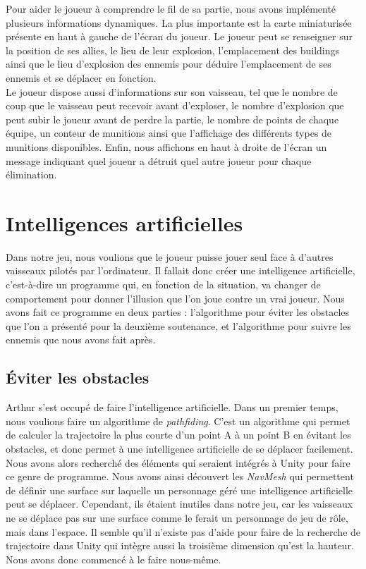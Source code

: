 \documentclass[12pt, titlepage]{article}
\begin{document}
\begin{spacing}{1.5}
Pour aider le joueur à comprendre le fil de sa partie, nous avons implémenté plusieurs informations dynamiques. La plus importante est la carte miniaturisée présente en haut à gauche de l'écran du joueur. Le joueur peut se renseigner sur la position de ses allies, le lieu de leur explosion, l'emplacement des buildings ainsi que le lieu d'explosion des ennemis pour déduire l'emplacement de ses ennemis et se déplacer en fonction.\\

 Le joueur dispose aussi d'informations sur son vaisseau, tel que le nombre de coup que le vaisseau peut recevoir avant d'exploser, le nombre d'explosion que peut subir le joueur avant de perdre la partie, le nombre de points de chaque équipe, un conteur de munitions ainsi que l'affichage des différents types de munitions disponibles. Enfin, nous affichons en haut à droite de l'écran un message indiquant quel joueur a détruit quel autre joueur pour chaque élimination.\\

\newpage
\section{Intelligences artificielles}

Dans notre jeu, nous voulions que le joueur puisse jouer seul face à d'autres vaisseaux pilotés par l'ordinateur. Il fallait donc créer une intelligence artificielle, c'est-à-dire un programme qui, en fonction de la situation, va changer de comportement pour donner l'illusion que l'on joue contre un vrai joueur. Nous avons fait ce programme en deux parties : l'algorithme pour éviter les obstacles que l'on a présenté pour la deuxième soutenance, et l'algorithme pour suivre les ennemis que nous avons fait après.\\

\subsection{Éviter les obstacles}

Arthur s'est occupé de faire l'intelligence artificielle. Dans un premier temps, nous voulions faire un  algorithme de \textit{pathfiding}. C'est un algorithme qui permet de calculer la trajectoire la plus courte d'un point A à un point B en évitant les obstacles, et donc permet à une intelligence artificielle de se déplacer facilement.\\

Nous avons alors recherché des éléments qui seraient intégrés à Unity pour faire ce genre de programme. Nous avons ainsi découvert les \textit{NavMesh} qui permettent de définir une surface sur laquelle un personnage géré une intelligence artificielle peut se déplacer. Cependant, ils étaient inutiles dans notre jeu, car les vaisseaux ne se déplace pas sur une surface comme le ferait un personnage de jeu de rôle, mais dans l'espace. Il semble qu'il n'existe pas d'aide pour faire de la recherche de trajectoire dans Unity qui intègre aussi la troisième dimension qu'est la hauteur. Nous avons donc commencé à le faire nous-même.\\


\end{spacing}
\end{document}
